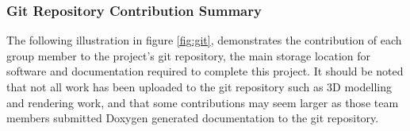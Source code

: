             \subsubsection{Git Repository Contribution Summary}

                The following illustration in figure \ref{fig:git}, demonstrates the contribution of each group member to the project's git repository, the main storage location for software and documentation required to complete this project. It should be noted that not all work has been uploaded to the git repository such as 3D modelling and rendering work, and that some contributions may seem larger as those team members submitted Doxygen generated documentation to the git repository.

                